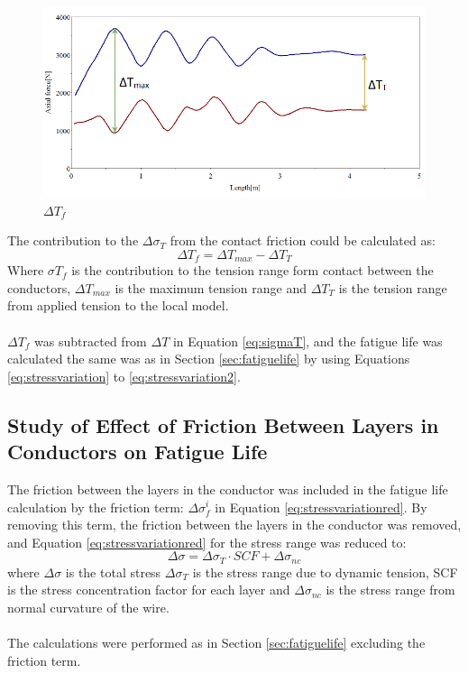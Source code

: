 \begin{figure}[H]
\centering
\includegraphics[scale=0.7]{figures/confric.PNG}
\caption[$\; \:$ $\Delta T_f$]{$\Delta T_f$}
 \label{fig:condfric}
\end{figure}
The contribution to the $\Delta \sigma_T$ from the contact friction could be calculated as:
\begin{equation}
    \Delta T_f = \Delta T_{max} - \Delta T_T
\end{equation}
Where $\sigma T_f$ is the contribution to the tension range form contact between the conductors, $\Delta T_{max}$ is the maximum tension range and $\Delta T_T$ is the tension range from applied tension to the local model.\\\\
$\Delta T_f$ was subtracted from $\Delta T$ in Equation \ref{eq:sigmaT}, and the fatigue life was calculated the same was as in Section \ref{sec:fatiguelife} by using Equations \ref{eq:stressvariation} to \ref{eq:stressvariation2}.

\subsection{Study of Effect of Friction Between Layers in Conductors on Fatigue Life}
The friction between the layers in the conductor was included in the fatigue life calculation by the friction term: $\Delta \sigma_f^i$ in Equation \ref{eq:stressvariationred}. By removing this term, the friction between the layers in the conductor was removed, and Equation \ref{eq:stressvariationred} for the stress range was reduced to:
\begin{equation}
    \Delta \sigma=\Delta \sigma_T \cdot SCF + \Delta \sigma_{nc}
\end{equation}
where $\Delta \sigma$ is the total stress $\Delta \sigma_T$ is the stress range due to dynamic tension, SCF is the stress concentration factor for each layer and $\Delta \sigma_{nc}$ is the stress range from normal curvature of the wire. \\\\
The calculations were performed as in Section \ref{sec:fatiguelife} excluding the friction term. 




